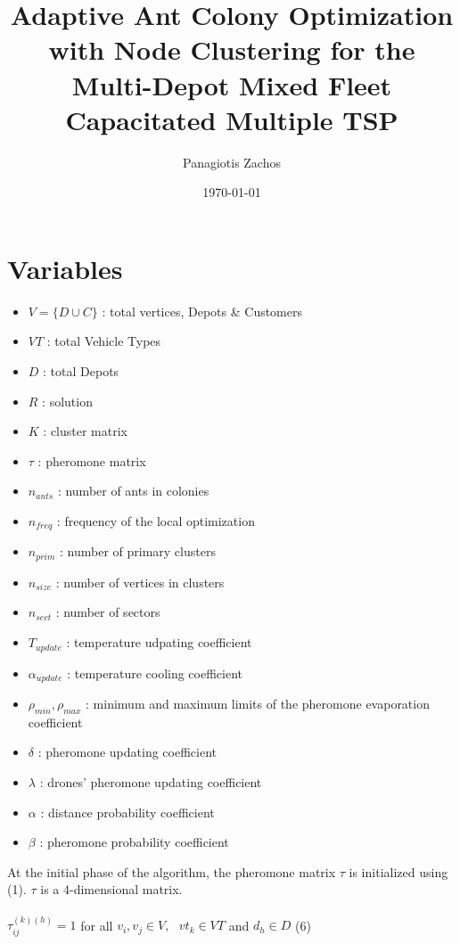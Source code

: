 \documentclass{article}
\begin{document}
	
	\title{Adaptive Ant Colony Optimization with Node Clustering for the Multi-Depot Mixed Fleet Capacitated Multiple TSP}
	\author{Panagiotis Zachos}
	\date{\today}
	
	\maketitle

		
	\section{Variables}
		
	\begin{itemize}
		\item $V = \{D\cup C\}$ : total vertices, Depots \& Customers\
		\item $VT$ : total Vehicle Types\
		\item $D$ : total Depots\
		\item $R$ : solution\
		\item $K$ : cluster matrix\
		\item $\tau$ : pheromone matrix
		\item $n_{ants}$ : number of ants in colonies\
		\item $n_{freq}$ : frequency of the local optimization\
		\item $n_{prim}$ : number of primary clusters\
		\item $n_{size}$ : number of vertices in clusters\
		\item $n_{sect}$ : number of sectors\
		\item $T_{update}$ : temperature udpating coefficient\
		\item $\alpha_{update}$ : temperature cooling coefficient\
		\item  $\rho_{min}, \rho_{max}$ : minimum and maximum limits of the pheromone evaporation coefficient\ 
		\item  $\delta$ : pheromone updating coefficient\
		\item $\lambda$ : drones' pheromone updating coefficient\
		\item $\alpha$ : distance probability coefficient\
		\item $\beta$ : pheromone probability coefficient\
	\end{itemize}
	At the initial phase of the algorithm, the pheromone matrix $\tau$ is initialized using (1). $\tau$ is a 4-dimensional matrix.\\\\
	$\tau_{ij}^{(k)(h)} = 1$ for all $v_i, v_j\in V, \text{ }vt_k\in VT$ and $d_h\in D$ (6)\\\\
\end{document}
